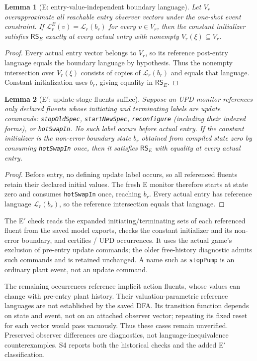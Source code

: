 \documentclass[11pt]{article}
\newtheorem{lemma}{Lemma}[section]
\begin{document}
\begin{lemma}[E: entry-value-independent boundary language]
\label{lem:rs-e}
Let $V_r$ overapproximate all reachable entry observer vectors under the one-shot event constraint. If $\mathcal L_r^E(v)=\mathcal L_r(b_r)$ for every $v\in V_r$, then the constant initializer satisfies $\mathsf{RS}_E$ exactly at every actual entry with nonempty $V_r(\xi)\subseteq V_r$.
\end{lemma}
\begin{proof}
Every actual entry vector belongs to $V_r$, so its reference post-entry language equals the boundary language by hypothesis. Thus the nonempty intersection over $V_r(\xi)$ consists of copies of $\mathcal L_r(b_r)$ and equals that language. Constant initialization uses $b_r$, giving equality in $\mathsf{RS}_E$.
\end{proof}
\begin{samepage}
\begin{lemma}[E$'$: update-stage fluents suffice]
\label{lem:rs-e-prime}
Suppose an UPD monitor references only declared fluents whose initiating and terminating labels are update commands: \texttt{stopOldSpec}, \texttt{startNewSpec}, \texttt{reconfigure} (including their indexed forms), or \texttt{hotSwapIn}. No such label occurs before actual entry. If the constant initializer is the non-error boundary state $b_r$ obtained from compiled state zero by consuming \texttt{hotSwapIn} once, then it satisfies $\mathsf{RS}_E$ with equality at every actual entry.
\end{lemma}
\begin{proof}
Before entry, no defining update label occurs, so all referenced fluents retain their declared initial values.
The fresh E monitor therefore starts at state zero and consumes \texttt{hotSwapIn} once, reaching $b_r$.
Every actual entry has reference language $\mathcal L_r(b_r)$, so the reference intersection equals that language.
\end{proof}
\end{samepage}
The E$'$ check reads the expanded initiating/terminating sets of each referenced fluent from the saved model exports, checks the constant initializer and its non-error boundary, and certifies \RSEExactUpd/\RSUpdOccurrences{} UPD occurrences. It uses the actual game's exclusion of pre-entry update commands; the older free-history diagnostic admits such commands and is retained unchanged. A name such as \texttt{stopPump} is an ordinary plant event, not an update command.

The remaining \RSEUnverifiedUpd{} occurrences reference implicit action fluents, whose values can change with pre-entry plant history. Their valuation-parametric reference languages are not established by the saved DFA. Its transition function depends on state and event, not on an attached observer vector; repeating its fixed reset for each vector would pass vacuously. Thus these cases remain unverified. Preserved observer differences are diagnostics, not language-inequivalence counterexamples. S4 reports both the historical checks and the added E$'$ classification.
\end{document}
